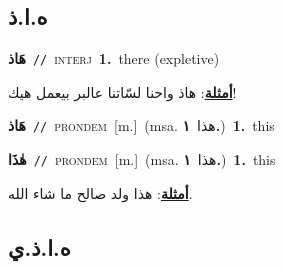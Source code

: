 \documentclass[10pt,a4paper,twoside]{article} %
\begin{document}
\begin{multicols}{2}
\vspace{-3mm}
\subsection*{\color{blue}\foreignlanguage{arabic}{ه.ا.ذ}\color{blue}{ (ntws)}} 

{\setlength\topsep{0pt}\textbf{\foreignlanguage{arabic}{هَاذ}}\ {\color{gray}\texttt{//}\color{black}}\ \textsc{interj}\ \textbf{1.}~there (expletive)\  \begin{flushright}\color{gray}\foreignlanguage{arabic}{\textbf{\underline{\foreignlanguage{arabic}{أمثلة}}}: هاذ واحنا لسّاتنا عالبر بيعمل هيك!}\end{flushright}\color{black}} \vspace{2mm}

{\setlength\topsep{0pt}\textbf{\foreignlanguage{arabic}{هَاذ}}\ {\color{gray}\texttt{//}\color{black}}\ \textsc{pron\textunderscore dem}\ [m.]\ \color{gray}(msa. \foreignlanguage{arabic}{هذا}~\foreignlanguage{arabic}{\textbf{١.}})\color{black}\ \textbf{1.}~this\ 

{\setlength\topsep{0pt}\textbf{\foreignlanguage{arabic}{هٰذَا}}\ {\color{gray}\texttt{//}\color{black}}\ \textsc{pron\textunderscore dem}\ [m.]\ \color{gray}(msa. \foreignlanguage{arabic}{هذا}~\foreignlanguage{arabic}{\textbf{١.}})\color{black}\ \textbf{1.}~this\  \begin{flushright}\color{gray}\foreignlanguage{arabic}{\textbf{\underline{\foreignlanguage{arabic}{أمثلة}}}: هذا ولد صالح ما شاء الله.}\end{flushright}\color{black}} \vspace{2mm}

\vspace{-3mm}
\subsection*{\color{blue}\foreignlanguage{arabic}{ه.ا.ذ.ي}\color{blue}{ (ntws)}} 

}
\end{multicols}
\end{document}
